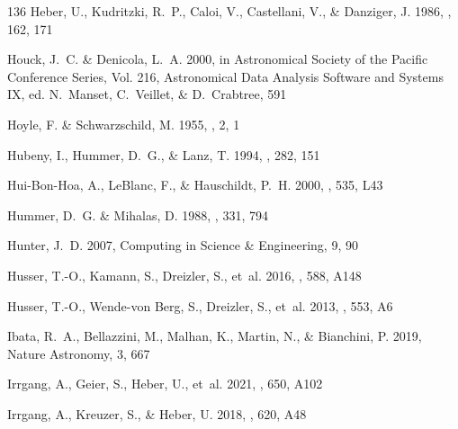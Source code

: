 \documentclass{aa}
\begin{document}
\begin{thebibliography}{136}
{Heber}, U., {Kudritzki}, R.~P., {Caloi}, V., {Castellani}, V., \& {Danziger},
  J. 1986, \aap, 162, 171

{Houck}, J.~C. \& {Denicola}, L.~A. 2000, in Astronomical Society of the
  Pacific Conference Series, Vol. 216, Astronomical Data Analysis Software and
  Systems IX, ed. N.~{Manset}, C.~{Veillet}, \& D.~{Crabtree}, 591

{Hoyle}, F. \& {Schwarzschild}, M. 1955, \apjs, 2, 1

{Hubeny}, I., {Hummer}, D.~G., \& {Lanz}, T. 1994, \aap, 282, 151

{Hui-Bon-Hoa}, A., {LeBlanc}, F., \& {Hauschildt}, P.~H. 2000, \apjl, 535, L43

{Hummer}, D.~G. \& {Mihalas}, D. 1988, \apj, 331, 794

Hunter, J.~D. 2007, Computing in Science \& Engineering, 9, 90

{Husser}, T.-O., {Kamann}, S., {Dreizler}, S., {et~al.} 2016, \aap, 588, A148

{Husser}, T.-O., {Wende-von Berg}, S., {Dreizler}, S., {et~al.} 2013, \aap,
  553, A6

{Ibata}, R.~A., {Bellazzini}, M., {Malhan}, K., {Martin}, N., \& {Bianchini},
  P. 2019, Nature Astronomy, 3, 667

{Irrgang}, A., {Geier}, S., {Heber}, U., {et~al.} 2021, \aap, 650, A102

{Irrgang}, A., {Kreuzer}, S., \& {Heber}, U. 2018{}, \aap, 620, A48


\end{thebibliography}
\end{document}

